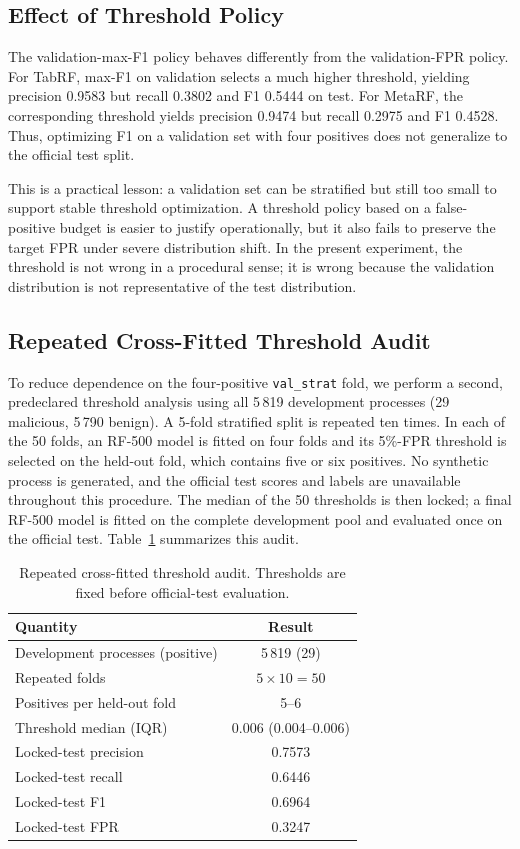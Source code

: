 \documentclass[10pt,journal,compsoc]{IEEEtran}
\begin{document}
\subsection{Effect of Threshold Policy}

The validation-max-F1 policy behaves differently from the validation-FPR policy. For TabRF, max-F1 on validation selects a much higher threshold, yielding precision 0.9583 but recall 0.3802 and F1 0.5444 on test. For MetaRF, the corresponding threshold yields precision 0.9474 but recall 0.2975 and F1 0.4528. Thus, optimizing F1 on a validation set with four positives does not generalize to the official test split.

This is a practical lesson: a validation set can be stratified but still too small to support stable threshold optimization. A threshold policy based on a false-positive budget is easier to justify operationally, but it also fails to preserve the target FPR under severe distribution shift. In the present experiment, the threshold is not wrong in a procedural sense; it is wrong because the validation distribution is not representative of the test distribution.

\subsection{Repeated Cross-Fitted Threshold Audit}
\label{sec:repeated_threshold}

To reduce dependence on the four-positive \texttt{val\_strat} fold, we perform a second, predeclared threshold analysis using all 5\,819 development processes (29 malicious, 5\,790 benign). A 5-fold stratified split is repeated ten times. In each of the 50 folds, an RF-500 model is fitted on four folds and its 5\%-FPR threshold is selected on the held-out fold, which contains five or six positives. No synthetic process is generated, and the official test scores and labels are unavailable throughout this procedure. The median of the 50 thresholds is then locked; a final RF-500 model is fitted on the complete development pool and evaluated once on the official test. Table~\ref{tab:repeated_threshold} summarizes this audit.

\begin{table}[t]
\centering
\caption{Repeated cross-fitted threshold audit. Thresholds are fixed before official-test evaluation.}
\label{tab:repeated_threshold}
\begin{tabular}{lc}
\toprule
\textbf{Quantity} & \textbf{Result} \\
\midrule
Development processes (positive) & 5\,819 (29) \\
Repeated folds & $5\times10=50$ \\
Positives per held-out fold & 5--6 \\
Threshold median (IQR) & 0.006 (0.004--0.006) \\
Locked-test precision & 0.7573 \\
Locked-test recall & 0.6446 \\
Locked-test F1 & 0.6964 \\
Locked-test FPR & 0.3247 \\
\bottomrule
\end{tabular}
\end{table}
\end{document}
